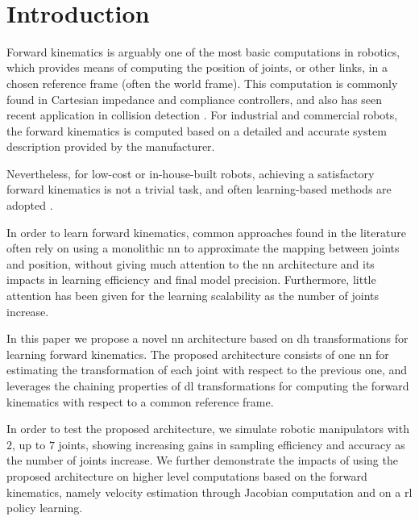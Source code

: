 $  $\section{Introduction}\label{sec: introduction}

Forward kinematics is arguably one of the most basic computations in robotics, which provides means of computing the position of joints, or other links, in a chosen reference frame (often the world frame).
%
This computation is commonly found in Cartesian impedance \cite{schaffer2002cartesian} and compliance \cite{scherzinger2017forward} controllers, and also has seen recent application in collision detection \cite{das2020forward}.
%
For industrial and commercial robots, the forward kinematics is computed based on a detailed and accurate system description provided by the manufacturer.

Nevertheless, for low-cost or in-house-built robots, achieving a satisfactory forward kinematics is not a trivial task, and often learning-based methods are adopted \cite{zajc2022low}.

In order to learn forward kinematics, common approaches found in the literature often rely on using a monolithic \gls{nn} to approximate the mapping between joints and position, without giving much attention to the \gls{nn} architecture and its impacts in learning efficiency and final model precision.
%
Furthermore, little attention has been given for the learning scalability as the number of joints increase.

In this paper we propose a novel \gls{nn} architecture based on \gls{dh} transformations for learning forward kinematics.
%
The proposed architecture consists of one \gls{nn} for estimating the transformation of each joint with respect to the previous one, and leverages the chaining properties of \gls{dl} transformations for computing the forward kinematics with respect to a common reference frame.
 
In order to test the proposed architecture, we simulate robotic manipulators with $2$, up to $7$ joints, showing increasing gains in sampling efficiency and accuracy as the number of joints increase.
%
We further demonstrate the impacts of using the proposed architecture on higher level computations based on the forward kinematics, namely velocity estimation through Jacobian computation and on a \gls{rl} policy learning.
 